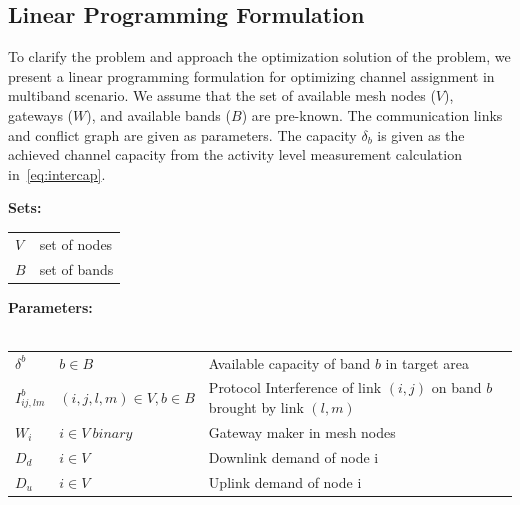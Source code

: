 \subsection{Linear Programming Formulation}
\label{subsec:linearopt}

To clarify the problem and approach the optimization solution of the problem, we present a linear programming 
formulation for optimizing channel assignment in multiband scenario. We assume that the set of available mesh nodes 
($V$), gateways ($W$), and available bands ($B$) are pre-known. The communication links and conflict graph are 
given as parameters. The capacity $\delta_b$ is given as the achieved channel capacity from the  activity level 
measurement calculation in~\ref{eq:intercap}. 


\noindent
{\bf Sets:}
\begin{tabular}{ll}
$V$ & set of nodes \\
$B$ & set of bands \\
\end{tabular}

\noindent
{\bf Parameters:}\\
\\
\begin{tabular}{llp{3.4cm}}
$\delta^b$ & $b \in B$ & Available capacity of band $b$ in target area\\
$I_{ij,lm}^b$ & $(i,j,l,m) \in V, b\in B $ & Protocol Interference of link $(i,j)$ on band $b$ brought by link $(l,m)$\\
$W_i$ & $i \in V\ binary$ & Gateway maker in mesh nodes\\
$D_{d}$ & $i \in V\ $ & Downlink demand of node i\\
$D_{u}$ & $i \in V\ $ & Uplink demand of node i\\
\end{tabular}

